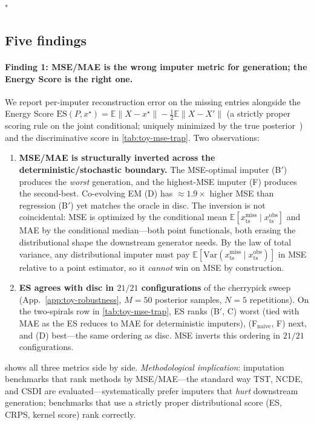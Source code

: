 "\documentclass{article}
\theoremstyle{plain}
\theoremstyle{definition}
\theoremstyle{remark}
\newcommand{\xts}{x_{\mathrm{ts}}}
\begin{document}
\subsection{Five findings}
\label{app:toy-findings}

\paragraph{Finding 1: MSE/MAE is the wrong imputer metric for generation; the Energy Score is the right one.}
We report per-imputer reconstruction error on the missing entries alongside the Energy Score $\mathrm{ES}(P,x^\star)=\mathbb{E}\|X-x^\star\|-\tfrac{1}{2}\mathbb{E}\|X-X'\|$ (a strictly proper scoring rule on the joint conditional; uniquely minimized by the true posterior~\citep{gneiting2007strictly}) and the discriminative score in \cref{tab:toy-mse-trap}. Two observations:
\begin{enumerate}[leftmargin=*,topsep=0pt,itemsep=2pt]
  \item \textbf{MSE/MAE is structurally inverted across the deterministic/stochastic boundary.} The MSE-optimal imputer (B$'$) produces the \emph{worst} generation, and the highest-MSE imputer (F) produces the second-best. Co-evolving EM (D) has ${\approx}1.9\times$ higher MSE than regression (B$'$) yet matches the oracle in disc. The inversion is not coincidental: MSE is optimized by the conditional mean $\mathbb{E}[\xts^{\mathrm{miss}}\mid\xts^{\mathrm{obs}}]$ and MAE by the conditional median---both point functionals, both erasing the distributional shape the downstream generator needs. By the law of total variance, any distributional imputer must pay $\mathbb{E}[\mathrm{Var}(\xts^{\mathrm{miss}}\mid\xts^{\mathrm{obs}})]$ in MSE relative to a point estimator, so it \emph{cannot} win on MSE by construction.
  \item \textbf{ES agrees with disc in $21/21$ configurations} of the cherrypick sweep (App.~\ref{app:toy-robustness}, $M=50$ posterior samples, $N=5$ repetitions). On the two-spirals row in \cref{tab:toy-mse-trap}, ES ranks (B$'$, C) worst (tied with MAE as the ES reduces to MAE for deterministic imputers), (F$_{\mathrm{naive}}$, F) next, and (D) best---the same ordering as disc. MSE inverts this ordering in $21/21$ configurations.
\end{enumerate}
 shows all three metrics side by side. \emph{Methodological implication}: imputation benchmarks that rank methods by MSE/MAE---the standard way TST, NCDE, and CSDI are evaluated---systematically prefer imputers that \emph{hurt} downstream generation; benchmarks that use a strictly proper distributional score (ES, CRPS, kernel score) rank correctly.
\end{document}
